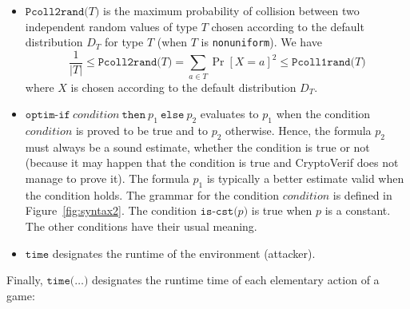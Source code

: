 \begin{itemize}
\item $\texttt{Pcoll2rand(}T\texttt{)}$ is the maximum probability of
collision between two independent random values of type $T$  
chosen according to the default distribution $D_T$ for type $T$
(when $T$ is \texttt{nonuniform}). We have
\[\frac{1}{|T|} \leq \texttt{Pcoll2rand(}T\texttt{)} = \sum_{a \in T} \Pr[X = a]^2 \leq \texttt{Pcoll1rand(}T\texttt{)}\]
where $X$ is chosen according to the default distribution $D_T$.

\item $\texttt{optim-if}\ \mathit{condition}\ \texttt{then}\ p_1\ \texttt{else}\ p_2$
evaluates to $p_1$ when the condition $\mathit{condition}$ is proved to be
true and to $p_2$ otherwise. Hence, the formula $p_2$ must always be a
sound estimate, whether the condition is true or not (because it may happen that
the condition is true and CryptoVerif does not manage to prove it). The formula
$p_1$ is typically a better estimate valid when the condition holds.
The grammar for the condition $\mathit{condition}$ is defined in Figure~\ref{fig:syntax2}.
The condition $\texttt{is-cst(}p\texttt{)}$ is true when $p$ is a constant.
The other conditions have their usual meaning.

\item $\texttt{time}$ designates the runtime of the environment (attacker).

\end{itemize}
Finally, $\texttt{time(}\ldots\texttt{)}$ designates the runtime time of each
elementary action of a game:
